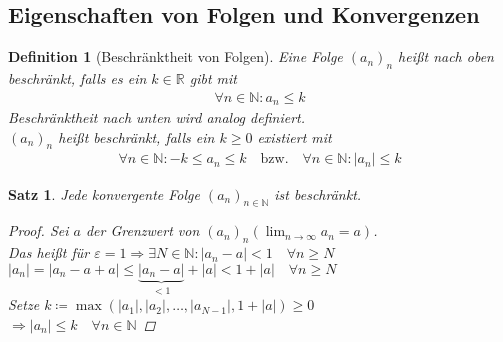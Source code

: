 \documentclass[11pt, twoside, a4paper]{article}
\theoremstyle{plain}
\newtheorem{definition}[blockelement]{Definition}
\newtheorem{satz}[blockelement]{Satz}
\newcommand{\pair}[1]{\left(#1\right)}
\newcommand{\abs}[1]{\left|#1\right|}
\newcommand{\impl}[0]{\Rightarrow{}}
\newcommand{\definedas}[0]{\coloneqq}
\newcommand{\fromto}{\rightarrow{}}
\newcommand{\naturalnumbers}{\mathbb{N}}
\newcommand{\realnumbers}{\mathbb{R}}
\begin{document}

    \subsection{Eigenschaften von Folgen und Konvergenzen}

    \begin{definition}[Beschränktheit von Folgen]
        \marginnote{[21. Nov]}
        Eine Folge $(a_n)_n$ heißt nach oben beschränkt, falls es ein $k\in\realnumbers$ gibt mit
        \begin{align*}
            \forall n\in \naturalnumbers\colon a_n \leq k\tag{$k$ ist obere Schranke für $(a_n)_n$}
        \end{align*}
        Beschränktheit nach unten wird analog definiert.\\
        $(a_n)_n$ heißt beschränkt, falls ein $k\geq 0$ existiert mit
        \begin{align*}
            \forall n\in\naturalnumbers\colon -k \leq a_n \leq k\quad \text{bzw.}\quad \forall n\in\naturalnumbers\colon \abs{a_n} \leq k
        \end{align*}
    \end{definition}

    \begin{satz}
        \label{satz:konv-folg-beschr}
        Jede konvergente Folge $(a_n)_{n\in\naturalnumbers}$ ist beschränkt.
        \begin{proof}
            Sei $a$ der Grenzwert von $(a_n)_n$\quad $\pair{\lim_{n\fromto\infty} a_n = a}$.\\
            Das heißt für $\varepsilon = 1 \impl \exists N\in\naturalnumbers\colon \abs{a_n-a} < 1\quad\forall n\geq N$\\
            $\abs{a_n} = \abs{a_n-a+a} \leq \underbrace{\abs{a_n-a}}_{<1} + \abs{a} < 1+\abs{a} \quad \forall n\geq N$\\
            Setze $k\definedas \max\pair{\abs{a_1}, \abs{a_2}, \dots, \abs{a_{N-1}}, 1+\abs{a}} \geq 0$\\
            $\impl \abs{a_n} \leq k \quad\forall n\in\naturalnumbers$\qedhere
        \end{proof}
    \end{satz}
\end{document}
